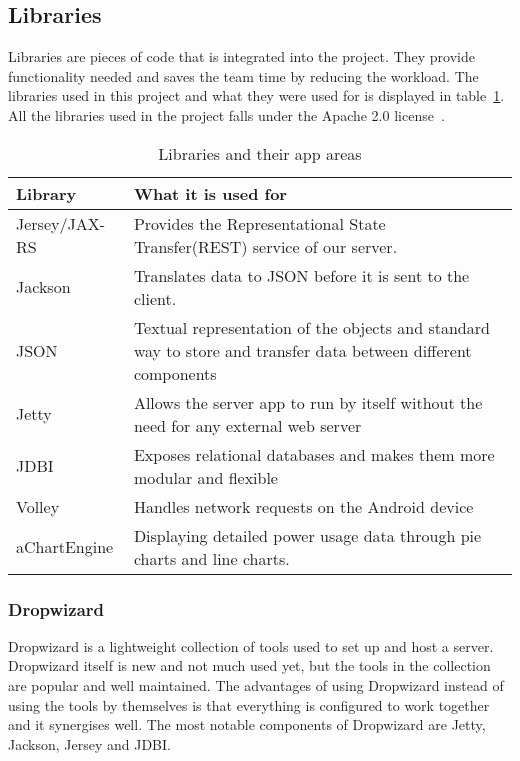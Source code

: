 \subsection{Libraries}
\label{sec:libraries}
Libraries are pieces of code that is integrated into the project. They provide functionality needed and saves the team time by reducing the workload. The libraries used in this project and what they were used for is displayed in table~\ref{tab:libs}.
 All the libraries used in the project falls under the Apache 2.0 license~\cite{Apache}.

\begin{table}[H]
\begin{tabular}{|l|p{12.9cm}|}
\hline
\textbf{Library }& \textbf{What it is used for}\\\hline
Jersey/JAX-RS & Provides the Representational State Transfer(REST) service of our server.\\\hline
Jackson&Translates data to JSON before it is sent to the client.\\\hline
JSON&Textual representation of the objects and standard way to store and transfer data between different components\\\hline
Jetty&Allows the server app to run by itself without the need for any external web server\\\hline
JDBI&Exposes relational databases and makes them more modular and flexible\\\hline
Volley & Handles network requests on the Android device\\\hline
aChartEngine& Displaying detailed power usage data through  pie charts and line charts.\\\hline
\end{tabular}
\caption{Libraries and their app areas}
\label{tab:libs}
\end{table}

\subsubsection{Dropwizard}
Dropwizard is a lightweight collection of tools used to set up and host a server. Dropwizard itself is new and not much used yet, but the tools in the collection are popular and well maintained. 
The advantages of using Dropwizard instead of using the tools by themselves is that everything is configured to work together and it synergises well. The most notable components of Dropwizard are Jetty, Jackson, Jersey and JDBI.



